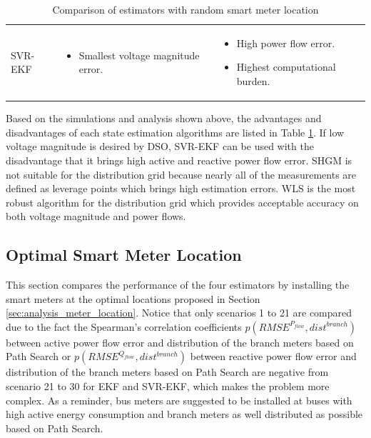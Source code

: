 \begin{table}[!h]
\begin{tabular}{m{1cm}|m{7cm}|m{7cm}|}
            SVR-EKF &   \begin{itemize}
                        \item Smallest voltage magnitude error.
                    \end{itemize}
                      &   
                    \begin{itemize}
                        \item High power flow error.
                        \item Highest computational burden.
                    \end{itemize}
                      \\ \cline{1-3}                       
        \end{tabular}
        \caption{Comparison of estimators with random smart meter location}
        \label{tab:compare_4_table}
    \end{table}
Based on the simulations and analysis shown above, the advantages and disadvantages of each state estimation algorithms are listed in Table \ref{tab:compare_4_table}. If low voltage magnitude is desired by DSO, SVR-EKF can be used with the disadvantage that it brings high active and reactive power flow error. SHGM is not suitable for the distribution grid because nearly all of the measurements are defined as leverage points which brings high estimation errors. WLS is the most robust algorithm for the distribution grid which provides acceptable accuracy on both voltage magnitude and power flows.   

\subsection{Optimal Smart Meter Location}
This section compares the performance of the four estimators by installing the smart meters at the optimal locations proposed in Section \ref{sec:analysis_meter_location}. Notice that only scenarios 1 to 21 are compared due to the fact the Spearman's correlation coefficients $p(RMSE^{P_{flow}},dist^{branch})$ between active power flow error and distribution of the branch meters based on Path Search or $p(RMSE^{Q_{flow}},dist^{branch})$ between reactive power flow error and distribution of the branch meters based on Path Search are negative from scenario 21 to 30 for EKF and SVR-EKF, which makes the problem more complex. As a reminder, bus meters are suggested to be installed at buses with high active energy consumption and branch meters as well distributed as possible based on Path Search. 

